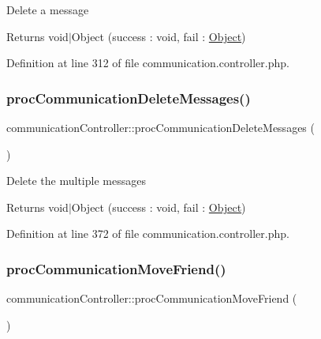 Delete a message \begin{DoxyReturn}{Returns}
void$\vert$\+Object (success \+: void, fail \+: \hyperlink{classObject}{Object}) 
\end{DoxyReturn}


Definition at line 312 of file communication.\+controller.\+php.

\mbox{\label{classcommunicationController_ac95be7a0206c59231d883d7fa4b17530}} 
\subsubsection{\texorpdfstring{proc\+Communication\+Delete\+Messages()}{procCommunicationDeleteMessages()}}
{\footnotesize\ttfamily communication\+Controller\+::proc\+Communication\+Delete\+Messages (\begin{DoxyParamCaption}{ }\end{DoxyParamCaption})}

Delete the multiple messages \begin{DoxyReturn}{Returns}
void$\vert$\+Object (success \+: void, fail \+: \hyperlink{classObject}{Object}) 
\end{DoxyReturn}


Definition at line 372 of file communication.\+controller.\+php.

\mbox{\label{classcommunicationController_ab9cfbae9deca92f28d0c88da039a6083}} 
\subsubsection{\texorpdfstring{proc\+Communication\+Move\+Friend()}{procCommunicationMoveFriend()}}
{\footnotesize\ttfamily communication\+Controller\+::proc\+Communication\+Move\+Friend (\begin{DoxyParamCaption}{ }\end{DoxyParamCaption})}

